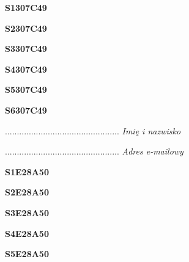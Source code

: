 \begin{turn}{90}\huge \textbf{S1307C49}\end{turn}

\begin{turn}{90}\huge \textbf{S2307C49}\end{turn}

\begin{turn}{90}\huge \textbf{S3307C49}\end{turn}

\begin{turn}{90}\huge \textbf{S4307C49}\end{turn}

\begin{turn}{90}\huge \textbf{S5307C49}\end{turn}

\begin{turn}{90}\huge \textbf{S6307C49}\end{turn}

\begin{turn}{90}\begin{minipage}{\linewidth} \vspace{20mm} ................................................  \textit{Imię i nazwisko}\end{minipage}\end{turn}

\begin{turn}{90}\begin{minipage}{\linewidth} \vspace{20mm} ................................................  \textit{Adres e-mailowy}\end{minipage}\end{turn}

\begin{turn}{90}\huge \textbf{S1E28A50}\end{turn}

\begin{turn}{90}\huge \textbf{S2E28A50}\end{turn}

\begin{turn}{90}\huge \textbf{S3E28A50}\end{turn}

\begin{turn}{90}\huge \textbf{S4E28A50}\end{turn}

\begin{turn}{90}\huge \textbf{S5E28A50}\end{turn}

